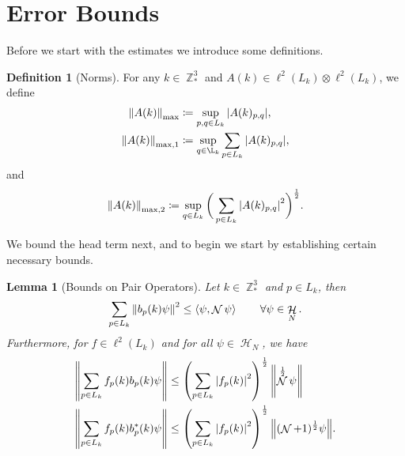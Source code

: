 \documentclass[sn-mathphys, Numbered ,a4paper]{sn-jnl}%
\DeclareMathOperator{\Z}{\mathbb{Z}}
\DeclareMathOperator{\HH}{\mathcal{H}}
\DeclareMathOperator{\NN}{\mathcal{N}}
\newcommand{\half}{\frac{1}{2}}
\newcommand{\eva}[1]{\left\langle #1 \right\rangle}
\theoremstyle{plain}
\newtheorem{lemma}[theorem]{Lemma}
\theoremstyle{definition}
\newtheorem{definition}[theorem]{Definition}
\theoremstyle{remark}
\newtheorem{remark}[theorem]{Remark}
\theoremstyle{plain}
\theoremstyle{definition}
\theoremstyle{remark}
\begin{document}
\section{Error Bounds}\label{subsec3}
 Before we start with the estimates we introduce some definitions.
\begin{definition}[Norms]
	For any $k \in \Z^3_*$ and $A(k)\in \ell^2(L_k)\otimes \ell^2(L_k)$, we define
	\begin{align}
		\norm{A(k)}_{\mathrm{max}} &\coloneq \sup\limits_{p,q \in L_k}\abs{A(k)_{p,q}},\\
		\norm{A(k)}_{\mathrm{max,1}} &\coloneq \sup\limits_{q \in \L_k}\sum\limits_{p \in L_k}\abs{A(k)_{p,q}},
	\end{align}
	and
	\begin{equation}
		\norm{A(k)}_{\mathrm{max},2} \coloneq \sup\limits_{q \in L_k}\bigg(\sum\limits_{p \in L_k}\abs{A(k)_{p,q}}^2\bigg)^\half.
	\end{equation}
\end{definition}
\begin{comment}
	\begin{remark}
		In the error estimates we sometimes write the supremum over all $p$ and/or $q$ in $\Z^3$, which is understood as follows.
		\begin{equation}
			\norm{A(k)}_{\mathrm{max}} = \mathds{1}_{L_k}(p)\mathds{1}_{L_k}(q) \sup\limits_{p,q \in \Z^3}\abs{A(k)_{p,q}}.
		\end{equation} 
		
	\end{remark}	
\end{comment}
We bound the head term next, and to begin we start by establishing certain necessary bounds.    
\begin{lemma}[Bounds on Pair Operators]\label{lem:pairest}
    Let $k \in \Z^3_*$ and $p \in L_k$, then
    \begin{equation}\label{eq:estopb}
        \sum\limits_{p \in L_k}\norm{b_p(k)\psi}^2 \leq  \eva{\psi, \NN\psi} \quad \quad \forall \psi \in \HH_N .
    \end{equation}
    Furthermore, for $f \in \ell^2(L_k)$ and for all $\psi \in \HH_N$, we have
    \begin{align}
        \norm{\sum\limits_{p\in L_k}f_p(k)b_p(k)\psi}&\leq \left(\sum\limits_{p \in L_{k}}\left|f_p(k)\right|^2\right)^\half \norm{\NN^\half\psi}\label{eq:estb}\\
        \norm{\sum\limits_{p\in L_k}f_p(k)b^*_p(k)\psi}&\leq \left(\sum\limits_{p \in L_{k}}\left|f_p(k)\right|^2\right)^\half \norm{(\NN+1)^\half\psi}.\label{eq:estb*}
    \end{align}
\end{lemma}
\end{document}
